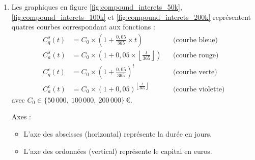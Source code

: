 \documentclass{article}
\begin{document}
\begin{enumerate}[label=\textbf{R2.\arabic*}]
                \item Les graphiques en figure \ref{fig:compound_interets_50k}, \ref{fig:compound_interets_100k} et \ref{fig:compound_interets_200k} représentent quatres courbes correspondant aux fonctions :
                \begin{align*}
                    C_q^s(t) &= C_0 \times \left(1 + \frac{0{,}05}{365} \times t\right) &&\text{(courbe bleue)} \\[2ex]
                    C_a^s(t) &= C_0 \times \left(1 + 0{,}05 \times \left\lfloor\frac{t}{365}\right\rfloor\right) &&\text{(courbe rouge)} \\[2ex]
                    C_q^c(t) &= C_0 \times \left(1 + \frac{0{,}05}{365} \right)^t &&\text{(courbe verte)} \\[2ex]
                    C_a^c(t) &= C_0 \times \left(1 + 0{,}05 \right)^{\left\lfloor\frac{t}{365}\right\rfloor} &&\text{(courbe violette)}
                \end{align*}
                avec \( C_0 \in \bigl\{50\,000,\ 100\,000,\ 200\,000\bigr\}\,\text{€} \).

                Axes :
                \begin{itemize}
                    \item L'axe des abscisses (horizontal) représente la durée en jours.
                    \item L'axe des ordonnées (vertical) représente le capital en euros.
                \end{itemize}


\end{enumerate}
\end{document}
